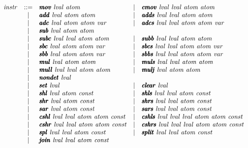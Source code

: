 \documentclass{article}
\begin{document}
\[
\begin{array}{rclcl}
  \instr &  ::= & \pmb\imov\ \lval\ \atom
         & \mid & \pmb\icmov\ \lval\ \lval\ \atom\ \atom \\
         & \mid & \pmb\iadd\ \lval\ \atom\ \atom
         & \mid & \pmb\iadds\ \lval\ \lval\ \atom\ \atom \\
         & \mid & \pmb\iadc\ \lval\ \atom\ \atom\ \var
         & \mid & \pmb\iadcs\ \lval\ \lval\ \atom\ \atom\ \var \\
         & \mid & \pmb\isub\ \lval\ \atom\ \atom \\
         & \mid & \pmb\isubc\ \lval\ \lval\ \atom\ \atom
         & \mid & \pmb\isubb\ \lval\ \lval\ \atom\ \atom \\
         & \mid & \pmb\isbc\ \lval\ \atom\ \atom\ \var
         & \mid & \pmb\isbcs\ \lval\ \lval\ \atom\ \atom\ \var \\
         & \mid & \pmb\isbb\ \lval\ \atom\ \atom\ \var
         & \mid & \pmb\isbbs\ \lval\ \lval\ \atom\ \atom\ \var \\
         & \mid & \pmb\imul\ \lval\ \atom\ \atom
         & \mid & \pmb\imuls\ \lval\ \lval\ \atom\ \atom \\
         & \mid & \pmb\imull\ \lval\ \lval\ \atom\ \atom
         & \mid & \pmb\imulj\ \lval\ \atom\ \atom \\
         & \mid & \pmb\inondet\ \lval \\
         & \mid & \pmb\iset\ \lval
         & \mid & \pmb\iclear\ \lval \\
         & \mid & \pmb\ishl\ \lval\ \atom\ \const
         & \mid & \pmb\ishls\ \lval\ \lval\ \atom\ \const \\
         & \mid & \pmb\ishr\ \lval\ \atom\ \const
         & \mid & \pmb\ishrs\ \lval\ \lval\ \atom\ \const \\
         & \mid & \pmb\isar\ \lval\ \atom\ \const
         & \mid & \pmb\isars\ \lval\ \lval\ \atom\ \const \\
         & \mid & \pmb\icshl\ \lval\ \lval\ \atom\ \atom\ \const
         & \mid & \pmb\icshls\ \lval\ \lval\ \lval\ \atom\ \atom\ \const \\
         & \mid & \pmb\icshr\ \lval\ \lval\ \atom\ \atom\ \const
         & \mid & \pmb\icshrs\ \lval\ \lval\ \lval\ \atom\ \atom\ \const \\
         & \mid & \pmb\ispl\ \lval\ \lval\ \atom\ \const
         & \mid & \pmb\isplit\ \lval\ \lval\ \atom\ \const \\
         & \mid & \pmb\ijoin\ \lval\ \lval\ \atom\ \const \\

\end{array}\]
\end{document}
